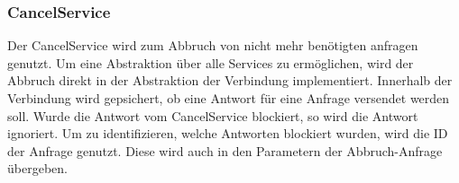 \documentclass[./einleitung.tex]{subfiles}
\begin{document}
    \subsubsection[CancelService]{CancelService }\label{subsubsec:cancel-service}
    Der CancelService wird zum Abbruch von nicht mehr benötigten anfragen genutzt.
    Um eine Abstraktion über alle Services zu ermöglichen, wird der Abbruch direkt in der Abstraktion der Verbindung implementiert.
    Innerhalb der Verbindung wird gepsichert, ob eine Antwort für eine Anfrage versendet werden soll.
    Wurde die Antwort vom CancelService blockiert, so wird die Antwort ignoriert.
    Um zu identifizieren, welche Antworten blockiert wurden, wird die ID der Anfrage genutzt.
    Diese wird auch in den Parametern der Abbruch-Anfrage übergeben.
\end{document}
